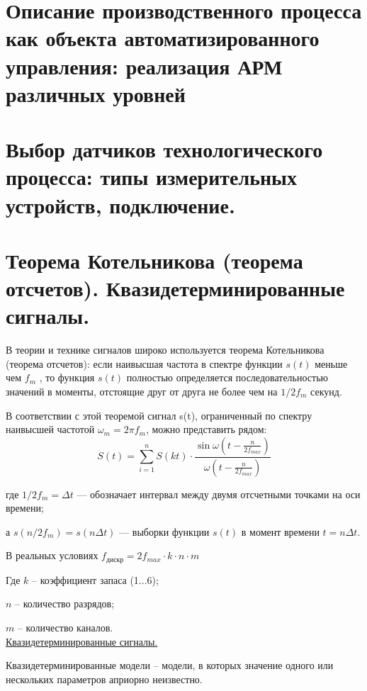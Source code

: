 \documentclass[unicode, 12pt, a4paper, oneside]{article}
\begin{document}
\section{Описание производственного процесса как объекта автоматизированного управления: реализация АРМ различных уровней}

\section{Выбор датчиков технологического процесса: типы измерительных устройств,  подключение.}

\section{Теорема Котельникова (теорема отсчетов). Квазидетерминированные сигналы.}

В теории и технике сигналов широко используется теорема Котельникова (теорема отсчетов): если наивысшая частота в спектре функции $s(t)$ меньше чем $f_m$ , то функция $s(t)$ полностью определяется последовательностью значений в моменты, отстоящие друг от друга не более чем на $1/2 f_m$ секунд.

В соответствии с этой теоремой сигнал s(t), ограниченный по спектру наивысшей частотой $\omega_m = 2\pi f_m$, можно представить рядом:
\begin{displaymath}
S(t) = \sum_{i=1}^{n}S(kt) \cdot \frac{\sin \omega (t-\frac{n}{2 f_{max}}) }{\omega (t-\frac{n}{2 f_{max}})}
\end{displaymath}
 
где $1/2f_m=\Delta t$ — обозначает интервал между двумя отсчетными точками на оси времени;

а $s(n/2f_m)=s(n\Delta t)$ — выборки функции $s(t)$ в момент времени $t=n\Delta t$.

В реальных условиях $f_\text{дискр} = 2f_{max} \cdot k \cdot n \cdot m$

Где $k$ – коэффициент запаса (1...6);

$n$ – количество разрядов;

$m$ – количество каналов.\\

\underline{Квазидетерминированные сигналы.}

Квазидетерминированные модели – модели, в которых значение одного или нескольких параметров априорно неизвестно.
\end{document}
